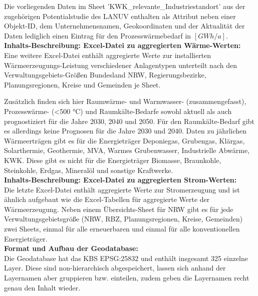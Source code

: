 			Die vorliegenden Daten im Sheet 'KWK\_relevante\_Industriestandort' aus der zugehörigen Potentialstudie des LANUV enthalten als Attribut neben einer Objekt-ID, dem Unternehmensnamen, Geokoordinaten und der Aktualität der Daten lediglich einen Eintrag für den Prozesswärmebedarf in $\left[GWh/a\right]$.\\
			
			\textbf{Inhalts-Beschreibung: Excel-Datei zu aggregierten Wärme-Werten:}\\
			Eine weitere Excel-Datei enthält aggregierte Werte zur installierten Wärmeerzeugungs-Leistung verschiedener Anlagentypen unterteilt nach den Verwaltungsgebiets-Größen Bundesland NRW, Regierungsbezirke, Planungsregionen, Kreise und Gemeinden je Sheet. 
			
			Zusätzlich finden sich hier Raumwärme- und Warmwasser- (zusammengefasst), Prozesswärme- (<500 °C) und Raumkälte-Bedarfe sowohl aktuell als auch prognostiziert für die Jahre 2030, 2040 und 2050. Für den Raumkälte-Bedarf gibt es allerdings keine Prognosen für die Jahre 2030 und 2040. Daten zu jährlichen Wärmeerträgen gibt es für die Energieträger Deponiegas, Grubengas, Klärgas, Solarthermie, Geothermie, MVA, Warmes Grubenwasser, Industrielle Abwärme, KWK. Diese gibt es nicht für die Energieträger Biomasse, Braunkohle, Steinkohle, Erdgas, Mineralöl und sonstige Kraftwerke. \\
			
			\textbf{Inhalts-Beschreibung: Excel-Datei zu aggregierten Strom-Werten:}\\
			Die letzte Excel-Datei enthält aggregierte Werte zur Stromerzeugung und ist ähnlich aufgebaut wie die Excel-Tabellen für aggregierte Werte der Wärmeerzeugung. Neben einem Übersichts-Sheet für NRW gibt es für jede Verwaltungsgebietsgröße (NRW, RBZ, Planungsregionen, Kreise, Gemeinden) zwei Sheets, einmal für alle erneuerbaren und einmal für alle konventionellen Energieträger.\\ 
			
			\textbf{Format und Aufbau der Geodatabase:}\\
			Die Geodatabase hat das KBS EPSG:25832 und enthält insgesamt 325 einzelne Layer. Diese sind non-hierarchisch abgespeichert, lassen sich anhand der Layernamen aber gruppieren bzw. einteilen, zudem geben die Layernamen recht genau den Inhalt wieder.\\
			
